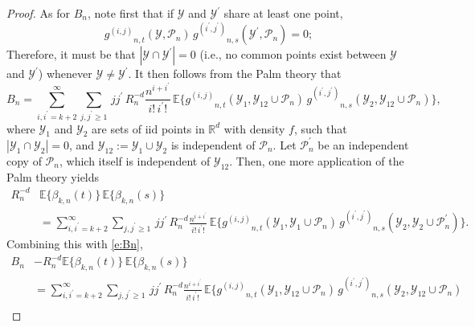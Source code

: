 \documentclass[11pt]{amsart}
\numberwithin{equation}{section}
\theoremstyle{plain}
\theoremstyle{definition}
\begin{document}
\begin{proof}
As for $B_n$, note first that if ${{\mathcal{Y}}}$ and ${{\mathcal{Y}^{\prime}}}$ share at least one point,
$$
{g^{(i,j)}}_{n,t}({{\mathcal{Y}}}, {\mathcal P_n})\, {g^{(i^{\prime},j^{\prime})}}_{n,s}({{\mathcal{Y}^{\prime}}}, {\mathcal P_n}) = 0;
$$
Therefore, it must be that $|{{\mathcal{Y}}} \cap {{\mathcal{Y}^{\prime}}}| = 0$ (i.e., no common points exist between ${{\mathcal{Y}}}$ and ${{\mathcal{Y}^{\prime}}}$) whenever ${{\mathcal{Y}}} \neq {{\mathcal{Y}^{\prime}}}$. It then follows from the Palm theory that
\begin{equation}  \label{e:Bn}
B_n =\sum_{i, {i^{\prime}} = k+2}^{\infty} \sum_{j, {j^{\prime}} \geq 1} \, j {j^{\prime}}\,  R_n^{-d}  \frac{n^{i+{i^{\prime}}}}{i!\, {i^{\prime}}!}\, {\mathbb{E}} \bigl\{ {g^{(i,j)}}_{n,t}({{\mathcal{Y}}}_1, {{\mathcal{Y}}}_{12} \cup {\mathcal P_n})\, {g^{(i^{\prime},j^{\prime})}}_{n,s} ({{\mathcal{Y}}}_2, {{\mathcal{Y}}}_{12} \cup {\mathcal P_n}) \bigr\},
\end{equation}
where ${{\mathcal{Y}}}_1$ and ${{\mathcal{Y}}}_2$ are sets of iid points in ${{\mathbb R}}^d$ with density $f$, such that $|{{\mathcal{Y}}}_1 \cap {{\mathcal{Y}}}_2| = 0$, and ${{\mathcal{Y}}}_{12} := {{\mathcal{Y}}}_1 \cup {{\mathcal{Y}}}_2$ is independent of ${\mathcal P_n}$. Let ${\mathcal P_n^{\prime}}$ be an independent copy of ${\mathcal P_n}$, which itself is independent of  ${{\mathcal{Y}}}_{12}$. Then, one more application of the Palm theory yields
\begin{align*}
R_n^{-d} &{\mathbb{E}} \bigl\{ \beta_{k,n}(t) \bigr\}\,{\mathbb{E}} \bigl\{ \beta_{k,n}(s) \bigr\} \\
&= \sum_{i, {i^{\prime}} = k+2}^{\infty} \sum_{j, {j^{\prime}} \geq 1} \, j {j^{\prime}}\, R_n^{-d} \frac{n^{i+{i^{\prime}}}}{i!\, {i^{\prime}}!}\, {\mathbb{E}} \bigl\{ {g^{(i,j)}}_{n,t}({{\mathcal{Y}}}_1, {{\mathcal{Y}}}_1 \cup {\mathcal P_n})\, {g^{(i^{\prime},j^{\prime})}}_{n,s} ({{\mathcal{Y}}}_2, {{\mathcal{Y}}}_2 \cup {\mathcal P_n^{\prime}}) \bigr\}.
\end{align*}
Combining this with \eqref{e:Bn},
\begin{align*}
B_n &- R_n^{-d} {\mathbb{E}} \bigl\{ \beta_{k,n}(t) \bigr\}\,{\mathbb{E}} \bigl\{ \beta_{k,n}(s) \bigr\}  \\
&= \sum_{i, {i^{\prime}} = k+2}^{\infty} \sum_{j, {j^{\prime}} \geq 1} \, j {j^{\prime}}\, R_n^{-d} \frac{n^{i+{i^{\prime}}}}{i!\, {i^{\prime}}!}\, {\mathbb{E}} \bigl\{ {g^{(i,j)}}_{n,t}({{\mathcal{Y}}}_1, {{\mathcal{Y}}}_{12} \cup {\mathcal P_n})\, {g^{(i^{\prime},j^{\prime})}}_{n,s} ({{\mathcal{Y}}}_2, {{\mathcal{Y}}}_{12} \cup {\mathcal P_n}) \\

\end{align*}
\end{proof}
\end{document}
